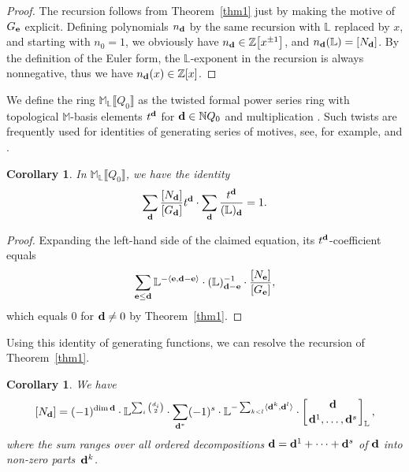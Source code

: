 \documentclass[pdftex]{sigma}
\numberwithin{equation}{section}
\newtheorem{Corollary}[Theorem]{Corollary}
\theoremstyle{definition}
\begin{document}
\begin{proof} The recursion follows from Theorem~\ref{thm1} just by making the motive of $G_{\bf e}$ explicit. Defining polynomials $n_{\bf d}$ by the same recursion with $\mathbb{L}$ replaced by $x$, and starting with $n_0=1$, we obviously have $n_{\bf d}\in\mathbb{Z}\big[x^{\pm 1}\big]$, and $n_{\bf d}(\mathbb{L})=[N_{\bf d}]$. By the definition of the Euler form, the $\mathbb{L}$-exponent in the recursion is always nonnegative, thus we have $n_{\bf d}(x)\in\mathbb{Z}[x]$.\end{proof}

We define the ring $\mathbb{M}_\mathbb{L}\llbracket Q_0\rrbracket$ as the twisted formal power series ring with topological $\mathbb{M}$-basis elements $t^{\bf d}$ for ${\bf d}\in \mathbb{N}Q_0$ and multiplication
.
Such twists are frequently used for identities of generating series of motives, see, for example, \cite[Section~2.1]{MozIntro} and \cite[Definition~3.2]{RCounting}.

\begin{Corollary}\label{gfi} In $\mathbb{M}_\mathbb{L}\llbracket Q_0\rrbracket$, we have the identity
\[\sum_{\bf d}\frac{[N_{\bf d}]}{[G_{\bf d}]}t^{\bf d}\cdot\sum_{\bf d}\frac{t^{\bf d}}{(\mathbb{L})_{\bf d}}=1.\]
\end{Corollary}

\begin{proof} Expanding the left-hand side of the claimed equation, its $t^{\bf d}$-coefficient equals
\[\sum_{{\bf e}\leq{\bf d}}\mathbb{L}^{-\langle{\bf e},{\bf d}-{\bf e}\rangle}\cdot(\mathbb{L})_{{\bf d}-{\bf e}}^{-1}\cdot\frac{[N_{\bf e}]}{[G_{\bf e}]},\]
which equals $0$ for ${\bf d}\not=0$ by Theorem~\ref{thm1}.\end{proof}

Using this identity of generating functions, we can resolve the recursion of Theorem~\ref{thm1}.

\begin{Corollary}\label{resolved} We have
\[[N_{\bf d}]=(-1)^{\dim {\bf d}}\cdot\mathbb{L}^{\sum_i{d_i\choose 2}}\cdot\sum_{{\bf d}^*}(-1)^s\cdot\mathbb{L}^{-\sum_{k<l}\langle{\bf d}^k,{\bf d}^l\rangle}\cdot\left[{{\bf d}\atop{{\bf d}^1,\dots,{\bf d}^s}}\right]_\mathbb{L},\]
where the sum ranges over all ordered decompositions ${\bf d}={\bf d}^1+\dots+{\bf d}^s$ of ${\bf d}$ into non-zero parts~${\bf d}^k$.
\end{Corollary}
\end{document}
